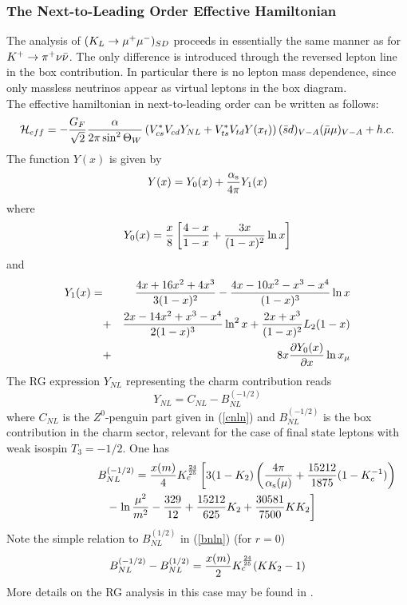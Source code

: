 \subsubsection{The Next-to-Leading Order Effective Hamiltonian}
               \label{sec:HeffRareKB:klmm:heff}
The analysis of $(K_L \to \mu^+\mu^-)_{SD}$ proceeds in essentially the same
manner as for $K^+ \to \pi^+\nu\bar\nu$. The only difference is introduced through the
reversed lepton line in the box contribution. In particular there is
no lepton mass dependence, since only massless neutrinos appear as
virtual leptons in the box diagram.\\
The effective hamiltonian in next-to-leading order can be written as
follows:
\begin{equation}\label{hklm}{\cal H}_{eff}=-{G_F \over{\sqrt 2}}{\alpha\over 2\pi \sin^2\Theta_W}
 \left( V^{\ast}_{cs}V_{cd} Y_{NL}+
V^{\ast}_{ts}V_{td} Y(x_t)\right)
 (\bar sd)_{V-A}(\bar\mu\mu)_{V-A} + h.c. \end{equation}
The function $Y(x)$ is given by
\begin{equation}\label{yy}
Y(x) = Y_0(x) + \frac{\alpha_{\rm s}}{4 \pi} Y_1(x)\end{equation}
where \cite{inamilim:81}
\begin{equation}\label{yy0}
Y_0(x) = {x\over 8}\left[{4-x\over 1-x}+{3x\over (1-x)^2}\ln x\right]
\end{equation}
and \cite{buchallaburas:93b}
\begin{eqnarray}\label{yy1}
Y_1(x) = &&{4x + 16 x^2 + 4x^3 \over 3(1-x)^2} -
           {4x - 10x^2-x^3-x^4\over (1-x)^3} \ln x\nonumber\\
         &+&{2x - 14x^2 + x^3 - x^4\over 2(1-x)^3} \ln^2 x
           + {2x + x^3\over (1-x)^2} L_2(1-x)\nonumber\\
         &+&8x {\partial Y_0(x) \over \partial x} \ln x_\mu
\end{eqnarray}
The RG expression $Y_{NL}$ representing the charm contribution reads
\begin{equation}\label{ynl} Y_{NL}=C_{NL}-B^{(-1/2)}_{NL}  \end{equation}
where $C_{NL}$ is the $Z^0$-penguin part given in (\ref{cnln}) and
$B^{(-1/2)}_{NL}$ is the box contribution in the charm sector, relevant
for the case of final state leptons with weak isospin $T_3=-1/2$.
One has \cite{buchallaburas:94}
\begin{eqnarray}\label{bmnln}
\lefteqn{B^{(-1/2)}_{NL}={x(m)\over 4}K^{24\over 25}_c\left[ 3(1-K_2)\left(
 {4\pi\over\as(\mu)}+{15212\over 1875}(1-K^{-1}_c)\right)\right.}\nonumber\\
&&-\left.\ln{\mu^2\over m^2}-
  {329\over 12}+{15212\over 625}K_2+{30581\over 7500}K K_2
  \right]
\end{eqnarray}
Note the simple relation to $B^{(1/2)}_{NL}$ in (\ref{bnln}) (for
$r=0$)
\begin{equation}\label{dbnl}
B^{(-1/2)}_{NL}-B^{(1/2)}_{NL}={x(m)\over 2}K^{24\over 25}_c (K K_2-1)
\end{equation}
More details on the RG analysis in this case may be found in
\cite{buchallaburas:94}.

